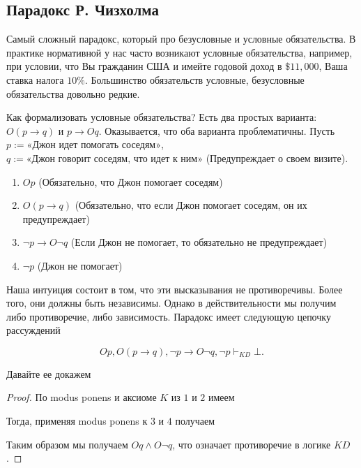 \documentclass[openany]{book}
\theoremstyle{plain}
\theoremstyle{definition}
\begin{document}
\subsection{Парадокс Р. Чизхолма}
Самый сложный парадокс, который про безусловные и условные обязательства. В практике нормативной у нас часто возникают условные обязательства, например, при условии, что Вы гражданин США и имейте годовой доход в \(\$11,000\), Ваша ставка налога \(10\%\). Большинство обязательств условные, безусловные обязательства довольно редкие. 

Как формализовать условные обязательства? Есть два простых варианта: \(O(p \to q)\) и \(p \to O q\). Оказывается, что оба варианта проблематичны. Пусть \(p := \text{«Джон идет помогать соседям»}\), \(q := \text{«Джон говорит соседям, что идет к ним»}\) (Предупреждает о своем визите).

\begin{enumerate}
    \item \(O p\) (Обязательно, что Джон помогает соседям)
    \item \(O (p \to q)\) (Обязательно, что если Джон помогает соседям, он их предупреждает)
    \item \(\neg p \to O \neg q\) (Если Джон не помогает, то обязательно не предупреждает)
    \item \(\neg p\) (Джон не помогает)
\end{enumerate}

Наша интуиция состоит в том, что эти высказывания не противоречивы. Более того, они должны быть независимы. Однако в действительности мы получим либо противоречие, либо зависимость. Парадокс имеет следующую цепочку рассуждений

\[O p, O (p \to q), \neg p \to O \neg q, \neg p \vdash_{K D} \bot.\]

Давайте ее докажем
\begin{proof}
    По modus ponens и аксиоме \(K\) из \(1\) и \(2\) имеем

    \begin{prooftree}
    \end{prooftree}

    Тогда, применяя modus ponens к \(3\) и \(4\) получаем

    \begin{prooftree}
    \end{prooftree}

    Таким образом мы получаем \(O q \land O \neg q\), что означает противоречие в логике \(K D\).

\end{proof}
\end{document}
